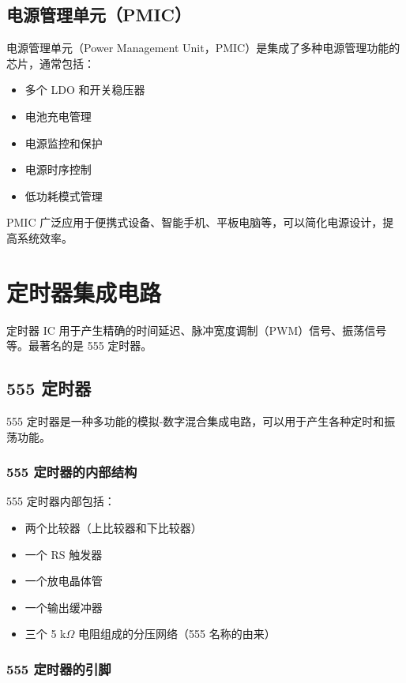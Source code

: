 \subsection{电源管理单元（PMIC）}

电源管理单元（Power Management Unit，PMIC）是集成了多种电源管理功能的芯片，通常包括：

\begin{itemize}
  \item 多个 LDO 和开关稳压器
  \item 电池充电管理
  \item 电源监控和保护
  \item 电源时序控制
  \item 低功耗模式管理
\end{itemize}

PMIC 广泛应用于便携式设备、智能手机、平板电脑等，可以简化电源设计，提高系统效率。

\section{定时器集成电路}

定时器 IC 用于产生精确的时间延迟、脉冲宽度调制（PWM）信号、振荡信号等。最著名的是 555 定时器。

\subsection{555 定时器}

555 定时器是一种多功能的模拟-数字混合集成电路，可以用于产生各种定时和振荡功能。

\subsubsection{555 定时器的内部结构}

555 定时器内部包括：
\begin{itemize}
  \item 两个比较器（上比较器和下比较器）
  \item 一个 RS 触发器
  \item 一个放电晶体管
  \item 一个输出缓冲器
  \item 三个 5 k$\Omega$ 电阻组成的分压网络（555 名称的由来）
\end{itemize}

\subsubsection{555 定时器的引脚}

